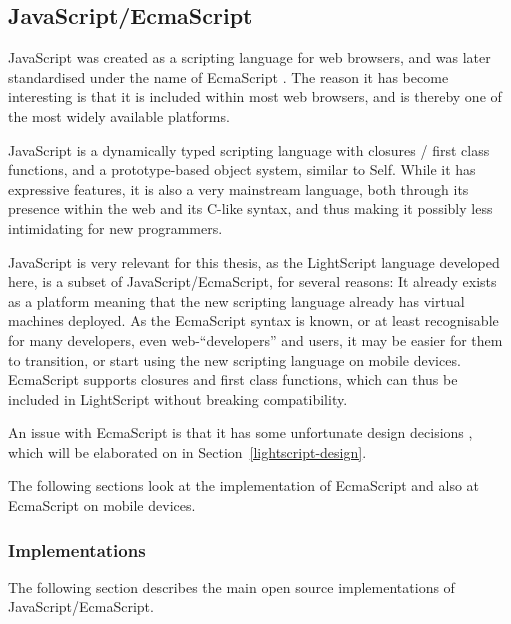 \documentclass[11pt]{report}
\begin{document}
\subsection{JavaScript/EcmaScript}
\label{JavaScript}
JavaScript was created as a scripting language for web browsers, and was later standardised under the name of EcmaScript \cite{ecma-262}.
The reason it has become interesting is that it is included within most web browsers, and is thereby one of the most widely available platforms.

JavaScript is a dynamically typed scripting language with closures / first class functions, and a prototype-based object system, similar to Self.
While it has expressive features, it is also a very mainstream language, both through its presence within the web and its C-like syntax, and thus making it possibly less intimidating for new programmers.

JavaScript is very relevant for this thesis, as the LightScript language developed here, is a subset of JavaScript/EcmaScript, for several reasons: 
It already exists as a platform meaning that the new scripting language already has virtual machines deployed. As the EcmaScript syntax is known, or at least recognisable for many developers, even web-``developers'' and users, it may be easier for them to transition, or start using the new scripting language on mobile devices. 
EcmaScript supports closures and first class functions, which can thus be included in LightScript without breaking compatibility.

An issue with EcmaScript is that it has some unfortunate design decisions \cite{crockford-web}, which will be elaborated on in Section~\ref{lightscript-design}.


The following sections look at the implementation of EcmaScript and also at EcmaScript on mobile devices. 

\subsubsection{Implementations}
The following section describes the main open source implementations of Java\-Script/EcmaScript.
\end{document}
